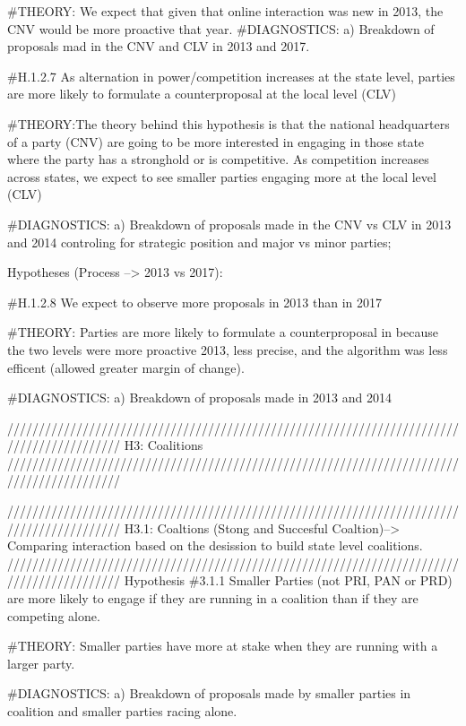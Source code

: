 \documentclass[]{article}
\begin{document}
\#THEORY: We expect that given that online interaction was new in 2013,
the CNV would be more proactive that year. \#DIAGNOSTICS: a) Breakdown
of proposals mad in the CNV and CLV in 2013 and 2017.

\#H.1.2.7 As alternation in power/competition increases at the state
level, parties are more likely to formulate a counterproposal at the
local level (CLV)

\#THEORY:The theory behind this hypothesis is that the national
headquarters of a party (CNV) are going to be more interested in
engaging in those state where the party has a stronghold or is
competitive. As competition increases across states, we expect to see
smaller parties engaging more at the local level (CLV)

\#DIAGNOSTICS: a) Breakdown of proposals made in the CNV vs CLV in 2013
and 2014 controling for strategic position and major vs minor parties;

Hypotheses (Process --\textgreater{} 2013 vs 2017):

\#H.1.2.8 We expect to observe more proposals in 2013 than in 2017

\#THEORY: Parties are more likely to formulate a counterproposal in
because the two levels were more proactive 2013, less precise, and the
algorithm was less efficent (allowed greater margin of change).

\#DIAGNOSTICS: a) Breakdown of proposals made in 2013 and 2014

//////////////////////////////////////////////////////////////////////////////////////////
H3: Coalitions
//////////////////////////////////////////////////////////////////////////////////////////

//////////////////////////////////////////////////////////////////////////////////////////
H3.1: Coaltions (Stong and Succesful Coaltion)--\textgreater{} Comparing
interaction based on the desission to build state level coalitions.\\
//////////////////////////////////////////////////////////////////////////////////////////
Hypothesis \#3.1.1 Smaller Parties (not PRI, PAN or PRD) are more likely
to engage if they are running in a coalition than if they are competing
alone.

\#THEORY: Smaller parties have more at stake when they are running with
a larger party.

\#DIAGNOSTICS: a) Breakdown of proposals made by smaller parties in
coalition and smaller parties racing alone.
\end{document}
